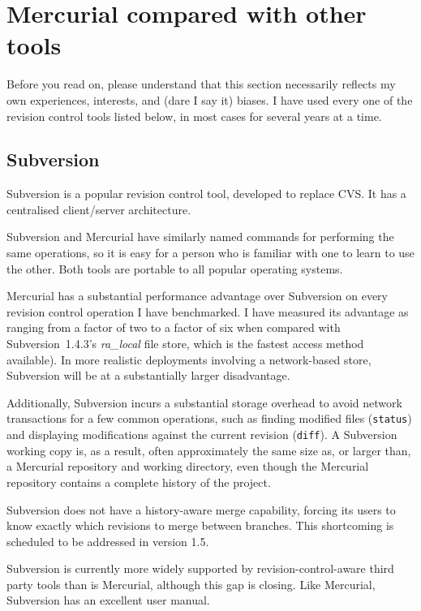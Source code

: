 \section{Mercurial compared with other tools}

Before you read on, please understand that this section necessarily
reflects my own experiences, interests, and (dare I say it) biases.  I
have used every one of the revision control tools listed below, in
most cases for several years at a time.

\subsection{Subversion}

Subversion is a popular revision control tool, developed to replace
CVS.  It has a centralised client/server architecture.

Subversion and Mercurial have similarly named commands for performing
the same operations, so it is easy for a person who is familiar with
one to learn to use the other.  Both tools are portable to all popular
operating systems.

Mercurial has a substantial performance advantage over Subversion on
every revision control operation I have benchmarked.  I have measured
its advantage as ranging from a factor of two to a factor of six when
compared with Subversion~1.4.3's \emph{ra\_local} file store, which is
the fastest access method available).  In more realistic deployments
involving a network-based store, Subversion will be at a substantially
larger disadvantage.

Additionally, Subversion incurs a substantial storage overhead to
avoid network transactions for a few common operations, such as
finding modified files (\texttt{status}) and displaying modifications
against the current revision (\texttt{diff}).  A Subversion working
copy is, as a result, often approximately the same size as, or larger
than, a Mercurial repository and working directory, even though the
Mercurial repository contains a complete history of the project.

Subversion does not have a history-aware merge capability, forcing its
users to know exactly which revisions to merge between branches.  This
shortcoming is scheduled to be addressed in version 1.5.

Subversion is currently more widely supported by
revision-control-aware third party tools than is Mercurial, although
this gap is closing.  Like Mercurial, Subversion has an excellent user
manual.

